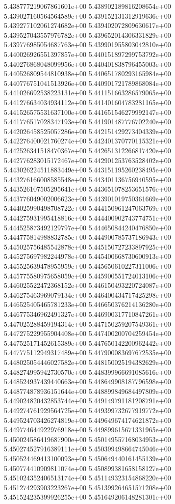 5.438777219067861601e+00
5.438902189816208654e+00
5.439027160564564589e+00
5.439152131312919636e+00
5.439277102061274682e+00
5.439402072809630617e+00
5.439527043557976782e+00
5.439652014306331829e+00
5.439776985054687763e+00
5.439901955803042810e+00
5.440026926551397857e+00
5.440151897299753792e+00
5.440276868048099956e+00
5.440401838796455003e+00
5.440526809544810938e+00
5.440651780293165984e+00
5.440776751041513926e+00
5.440901721789868084e+00
5.441026692538223131e+00
5.441151663286579065e+00
5.441276634034934112e+00
5.441401604783281165e+00
5.441526575531637100e+00
5.441651546279992147e+00
5.441776517028347193e+00
5.441901487776702240e+00
5.442026458525057286e+00
5.442151429273404339e+00
5.442276400021760274e+00
5.442401370770115321e+00
5.442526341518470367e+00
5.442651312266817420e+00
5.442776283015172467e+00
5.442901253763528402e+00
5.443026224511883449e+00
5.443151195260238495e+00
5.443276166008585548e+00
5.443401136756940595e+00
5.443526107505295641e+00
5.443651078253651576e+00
5.443776049002006623e+00
5.443901019750361669e+00
5.444025990498708722e+00
5.444150961247063769e+00
5.444275931995418816e+00
5.444400902743774751e+00
5.444525873492129797e+00
5.444650844240476850e+00
5.444775814988832785e+00
5.444900785737186943e+00
5.445025756485542878e+00
5.445150727233897925e+00
5.445275697982244978e+00
5.445400668730600913e+00
5.445525639478955959e+00
5.445650610227311006e+00
5.445775580975658059e+00
5.445900551724013106e+00
5.446025522472368152e+00
5.446150493220724087e+00
5.446275463969079134e+00
5.446400434717425298e+00
5.446525405465781233e+00
5.446650376214136280e+00
5.446775346962491327e+00
5.446900317710847261e+00
5.447025288459194314e+00
5.447150259207549361e+00
5.447275229955904408e+00
5.447400200704259454e+00
5.447525171452615389e+00
5.447650142200962442e+00
5.447775112949317489e+00
5.447900083697672535e+00
5.448025054446027582e+00
5.448150025194382629e+00
5.448274995942730570e+00
5.448399966691085616e+00
5.448524937439440663e+00
5.448649908187796598e+00
5.448774878936151644e+00
5.448899849684497809e+00
5.449024820432853744e+00
5.449149791181208791e+00
5.449274761929564725e+00
5.449399732677919772e+00
5.449524703426274819e+00
5.449649674174621872e+00
5.449774644922976918e+00
5.449899615671331965e+00
5.450024586419687900e+00
5.450149557168034953e+00
5.450274527916389111e+00
5.450399498664745046e+00
5.450524469413100093e+00
5.450649440161455139e+00
5.450774410909811074e+00
5.450899381658158127e+00
5.451024352406513174e+00
5.451149323154868220e+00
5.451274293903223267e+00
5.451399264651571208e+00
5.451524235399926255e+00
5.451649206148281301e+00
